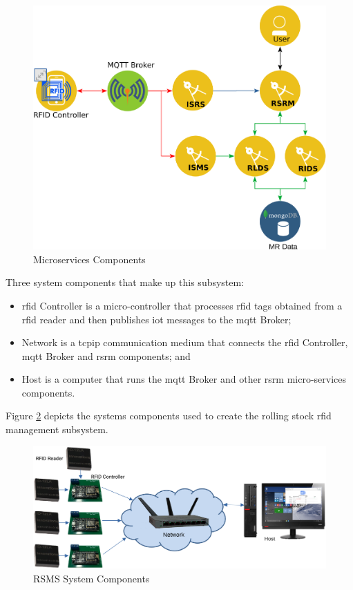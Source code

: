 \begin{figure}[H]
	\centering
		\includegraphics[scale=0.15]{../Images/rsms_microservices.png}
	\caption{Microservices Components}
	\label{fig:rsms-ms-components}
\end{figure}

Three system components that make up this subsystem:
\begin{itemize}
\item \gls{rfid} Controller is a micro-controller that processes \gls{rfid} tags obtained from a \gls{rfid} reader and then publishes \gls{iot} messages to the \gls{mqtt} Broker;
\item Network is a \gls{tcpip} communication medium that connects the \gls{rfid} Controller, \gls{mqtt} Broker and \gls{rsrm} components; and
\item Host is a computer that runs the \gls{mqtt} Broker and other \gls{rsrm} micro-services components.
\end{itemize}
Figure \ref{fig:rsms-system} depicts the systems components used to create the rolling stock \gls{rfid} management subsystem.

\begin{figure}[H]
	\centering
		\includegraphics[scale=0.15]{../Images/rsms_system.png}
	\caption{RSMS System Components}
	\label{fig:rsms-system}
\end{figure}

